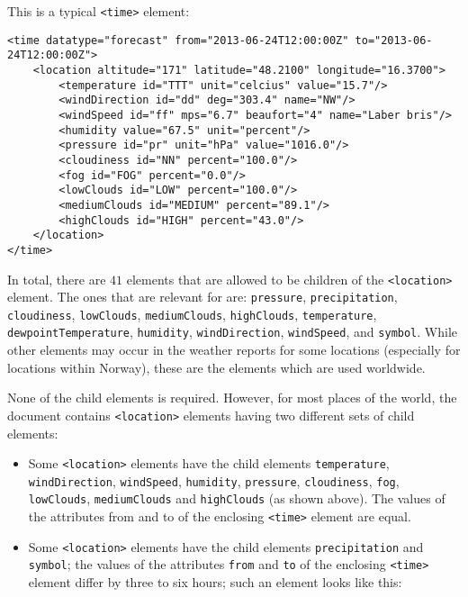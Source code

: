 This is a typical \texttt{<time>} element:

\begin{lstlisting}
<time datatype="forecast" from="2013-06-24T12:00:00Z" to="2013-06-24T12:00:00Z">
	<location altitude="171" latitude="48.2100" longitude="16.3700">
		<temperature id="TTT" unit="celcius" value="15.7"/>
		<windDirection id="dd" deg="303.4" name="NW"/>
		<windSpeed id="ff" mps="6.7" beaufort="4" name="Laber bris"/>
		<humidity value="67.5" unit="percent"/>
		<pressure id="pr" unit="hPa" value="1016.0"/>
		<cloudiness id="NN" percent="100.0"/>
		<fog id="FOG" percent="0.0"/>
		<lowClouds id="LOW" percent="100.0"/>
		<mediumClouds id="MEDIUM" percent="89.1"/>
		<highClouds id="HIGH" percent="43.0"/>
	</location>
</time>
\end{lstlisting}

In total, there are $41$ elements that are allowed to be children of the \texttt{<location>} element. The ones that are relevant for \smarthomeweather are: \texttt{pressure}, \texttt{precipitation}, \texttt{cloudiness}, \texttt{lowClouds}, \texttt{mediumClouds}, \texttt{highClouds}, \texttt{temperature}, \texttt{dewpoint\hspace{0pt}Temperature}, \texttt{humidity}, \texttt{windDirection}, \texttt{windSpeed}, and \texttt{symbol}. While other elements may occur in the weather reports for some locations (especially for locations within Norway), these are the elements which are used worldwide.

None of the child elements is required. However, for most places of the world, the  document contains \texttt{<location>} elements having two different sets of child elements:

\begin{itemize}
  \item Some \texttt{<location>} elements have the child elements \texttt{temperature}, \texttt{windDirection}, \texttt{windSpeed}, \texttt{humidity}, \texttt{pressure}, \texttt{cloudiness}, \texttt{fog}, \texttt{lowClouds}, \texttt{mediumClouds} and \texttt{highClouds} (as shown above). The values of the attributes from and to of the enclosing \texttt{<time>} element are equal. %
  
  \item Some \texttt{<location>} elements have the child elements \texttt{precipitation} and \texttt{symbol}; the values of the attributes \texttt{from} and \texttt{to} of the enclosing \texttt{<time>} element differ by three to six hours; such an element looks like this:
\end{itemize}

